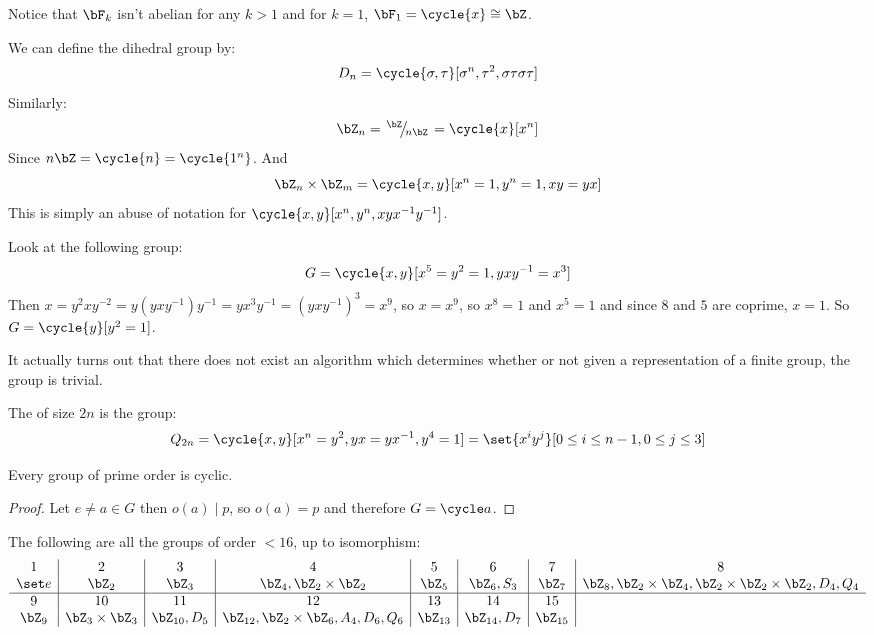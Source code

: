\documentclass[10pt]{article}
\def\slfrac#1#2{\left.{}^{#1}\mkern-4mu\middle/\mkern-3mu{}_{#2}\right.}
\let\divides=\mid
\begin{document}
Notice that $\bF_k$ isn't abelian for any $k>1$ and for $k=1$, $\bF_1=\cycle{x}\cong\bZ$.

We can define the dihedral group by:
\[ D_n = \cycle{\sigma,\tau}[\sigma^n, \tau^2, \sigma\tau\sigma\tau] \]
Similarly:
\[ \bZ_n = \slfrac\bZ{n\bZ} = \cycle{x}[x^n] \]
Since $n\bZ=\cycle{n}=\cycle{1^n}$.
And
\[ \bZ_n\times\bZ_m=\cycle{x,y}[x^n=1,y^n=1,xy=yx] \]
This is simply an abuse of notation for $\cycle{x,y}[x^n,y^n,xyx^{-1}y^{-1}]$.

Look at the following group:
\[ G = \cycle{x,y}[x^5=y^2=1,yxy^{-1}=x^3] \]
Then $x=y^2xy^{-2}=y(yxy^{-1})y^{-1}=yx^3y^{-1}=(yxy^{-1})^3=x^9$, so $x=x^9$, so $x^8=1$ and $x^5=1$ and since $8$ and $5$ are coprime, $x=1$.
So $G=\cycle{y}[y^2=1]$.

It actually turns out that there does not exist an algorithm which determines whether or not given a representation of a finite group, the group is trivial.

\begin{defn*}

    The  of size $2n$ is the group:
    \[ Q_{2n} = \cycle{x,y}[x^n=y^2, yx=yx^{-1}, y^4=1] = \set{x^iy^j}[0\leq i\leq n-1, 0\leq j\leq 3] \]

\end{defn*}

\begin{lemm*}

    Every group of prime order is cyclic.

\end{lemm*}

\begin{proof}

    Let $e\neq a\in G$ then $o(a)\divides p$, so $o(a)=p$ and therefore $G=\cycle a$.

\end{proof}

\begin{thrm*}

    The following are all the groups of order $<16$, up to isomorphism:
    \[ \begin{array}{c|c|c|c|c|c|c|c}
        1 & 2 & 3 & 4 & 5 & 6 & 7 & 8 \\
        \set e & \bZ_2 & \bZ_3 & \bZ_4, \bZ_2\times\bZ_2 & \bZ_5 & \bZ_6, S_3 & \bZ_7 & \bZ_8, \bZ_2\times\bZ_4, \bZ_2\times\bZ_2\times\bZ_2, D_4, Q_4 \\
        \hline 9 & 10 & 11 & 12 & 13 & 14 & 15 \\
        \bZ_9 & \bZ_3\times\bZ_3 & \bZ_{10}, D_5 &
        \bZ_{12}, \bZ_2\times\bZ_6, A_4, D_6, Q_6 & \bZ_{13} & \bZ_{14}, D_7 & \bZ_{15}
       \end{array}
    \]

\end{thrm*}
\end{document}
